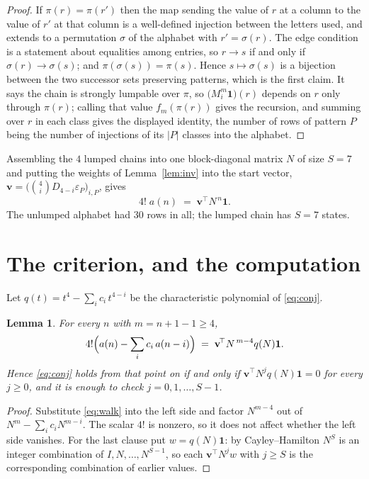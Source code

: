 \documentclass[11pt,a4paper]{article}
\theoremstyle{plain}
\newtheorem{lemma}[theorem]{Lemma}
\theoremstyle{definition}
\begin{document}
\begin{proof}
If $\pi(r)=\pi(r')$ then the map sending the value of $r$ at a column to the value of $r'$
at that column is a well-defined injection between the letters used, and extends to a
permutation $\sigma$ of the alphabet with $r'=\sigma(r)$. The edge condition is a statement
about equalities among entries, so $r\to s$ if and only if $\sigma(r)\to\sigma(s)$; and
$\pi(\sigma(s))=\pi(s)$. Hence $s\mapsto\sigma(s)$ is a bijection between the two successor
sets preserving patterns, which is the first claim. It says the chain is strongly lumpable
over $\pi$, so $\bigl(M_i^{m}\mathbf{1}\bigr)(r)$ depends on $r$ only through $\pi(r)$;
calling that value $f_m(\pi(r))$ gives the recursion, and summing over $r$ in each class
gives the displayed identity, the number of rows of pattern $P$ being the number of
injections of its $|P|$ classes into the alphabet.
\end{proof}

Assembling the $4$ lumped chains into one block-diagonal matrix $N$ of size $S=7$ and
putting the weights of Lemma~\ref{lem:inv} into the start vector,
$\mathbf{v}=\bigl(\binom{4}{i}D_{4-i}\varepsilon_P\bigr)_{i,P}$, gives
\begin{equation}\label{eq:walk}
4!\;a(n)\;=\;\mathbf{v}^{\!\top}N^{\,n}\mathbf{1} .
\end{equation}
The unlumped alphabet had $30$ rows in all; the lumped chain has $S=7$ states.

\section{The criterion, and the computation}

Let $q(t)=t^{4}-\sum_i c_i\,t^{4-i}$ be the characteristic polynomial of
\eqref{eq:conj}.

\begin{lemma}\label{lem:crit}
For every $n$ with $m=n+1-1\ge4$,
\[
4!\Bigl(a(n)-\sum_i c_i\,a(n-i)\Bigr)\;=\;\mathbf{v}^{\!\top}N^{\,m-4}q(N)\mathbf{1} .
\]
Hence \eqref{eq:conj} holds from that point on if and only if
$\mathbf{v}^{\!\top}N^{j}q(N)\mathbf{1}=0$ for every $j\ge0$, and it is enough to check
$j=0,1,\dots,S-1$.
\end{lemma}

\begin{proof}
Substitute \eqref{eq:walk} into the left side and factor $N^{m-4}$ out of
$N^{m}-\sum_i c_iN^{m-i}$. The scalar $4!$ is nonzero, so it does not affect whether
the left side vanishes. For the last clause put $w=q(N)\mathbf{1}$: by Cayley--Hamilton
$N^{S}$ is an integer combination of $I,N,\dots,N^{S-1}$, so each
$\mathbf{v}^{\!\top}N^{j}w$ with $j\ge S$ is the corresponding combination of earlier
values.
\end{proof}
\end{document}
